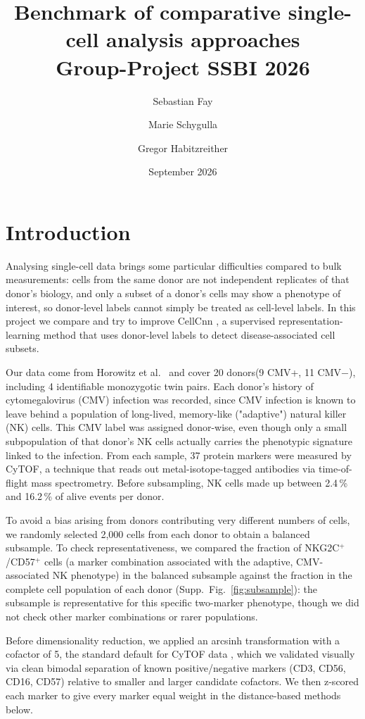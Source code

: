 \documentclass[11pt,a4paper]{article}
\title{Benchmark of comparative single-cell analysis approaches\\
\large Group-Project SSBI 2026}
\author{Sebastian Fay \and Marie Schygulla \and Gregor Habitzreither}
\date{September 2026}
\newcommand{\dr}{dimensionality reduction}
\begin{document}
\maketitle

\section*{Introduction}
Analysing single-cell data brings some particular difficulties compared to bulk measurements: cells
from the same donor are not independent replicates of that donor's biology, and only a subset of a
donor's cells may show a phenotype of interest, so donor-level labels cannot simply be treated as
cell-level labels. In this project we compare and try to improve CellCnn \citep{arvaniti2017cellcnn}, a supervised representation-learning method that uses donor-level labels to detect disease-associated cell subsets.

Our data come from Horowitz et al.\ \citep{horowitz2013nk} and cover 20 donors(9 CMV+, 11 CMV$-$), including 4 identifiable monozygotic twin pairs. Each donor's history of cytomegalovirus (CMV) infection was recorded, since CMV infection is known to leave behind a population of long-lived, memory-like ("adaptive") natural killer (NK) cells. This CMV label was assigned donor-wise, even though only a small subpopulation of that donor's NK cells actually carries the phenotypic signature linked to the infection. From each sample, 37 protein markers were measured by CyTOF, a technique that reads out metal-isotope-tagged antibodies via time-of-flight
mass spectrometry. Before subsampling, NK cells made up between 2.4\,\% and 16.2\,\% of alive events per donor.

To avoid a bias arising from donors contributing very different numbers of cells, we randomly selected
2{,}000 cells from each donor to obtain a balanced subsample. To check representativeness, we compared
the fraction of NKG2C$^+$/CD57$^+$ cells (a marker combination associated with the adaptive,
CMV-associated NK phenotype) in the balanced subsample against the fraction in the complete cell
population of each donor (Supp.\ Fig.~\ref{fig:subsample}): the subsample is representative for this
specific two-marker phenotype, though we did not check other marker combinations or rarer populations.

Before \dr{}, we applied an arcsinh transformation with a cofactor of 5, the standard default for CyTOF
data \citep{bendall2011masscytometry,nowicka2017cytofworkflow}, which we validated visually via clean
bimodal separation of known positive/negative markers (CD3, CD56, CD16, CD57) relative to smaller and
larger candidate cofactors. We then z-scored each marker to give every marker equal weight in the distance-based methods below.
\end{document}
